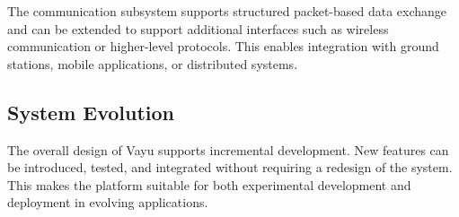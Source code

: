 The communication subsystem supports structured packet-based data exchange and can be extended to support additional interfaces such as wireless communication or higher-level protocols. This enables integration with ground stations, mobile applications, or distributed systems.

\subsection{System Evolution}

The overall design of Vayu supports incremental development. New features can be introduced, tested, and integrated without requiring a redesign of the system. This makes the platform suitable for both experimental development and deployment in evolving applications.
